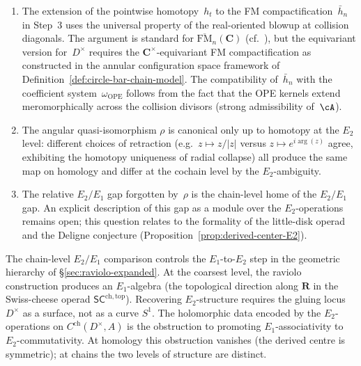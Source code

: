 \begin{remark}%
\label{rem:chain-D-vs-S1-scope}%
\begin{enumerate}[label=\textup{(\alph*)}]
\item The extension of the pointwise homotopy~$h_t$ to
 the FM compactification~$\bar h_n$ in Step~3 uses the
 universal property of the real-oriented blowup at
 collision diagonals. The argument is standard for
 $\overline{\mathrm{FM}}_n(\mathbf{C})$
 (cf.\ \cite{Sinha2004,LV12}), but the equivariant
 version for~$D^\times$ requires the
 $\mathbf{C}^\times$-equivariant FM compactification
 as constructed in the annular configuration space
 framework of
 Definition~\textup{\ref{def:circle-bar-chain-model}}.
 The compatibility of~$\bar h_n$ with the coefficient
 system~$\omega_{\mathrm{OPE}}$ follows from the fact
 that the OPE kernels extend meromorphically across
 the collision divisors (strong admissibility of~$\cA$).
\item The angular quasi-isomorphism $\rho$ is canonical only up to homotopy at the $E_2$ level: different choices of
 retraction (e.g.\ $z\mapsto z/|z|$ versus
 $z\mapsto e^{i\arg(z)}$ agree, exhibiting the homotopy uniqueness of radial collapse)
 all produce the same map on
 homology and differ at the cochain level by the $E_2$-ambiguity.
\item The relative \(E_2/E_1\) gap forgotten by~$\rho$ is the chain-level
 home of the $E_2/E_1$ gap. An explicit description of this gap
 as a module over the $E_2$-operations remains
 open; this question relates to the formality of the
 little-disk operad and the Deligne conjecture
 (Proposition~\textup{\ref{prop:derived-center-E2}}).
\end{enumerate}
\end{remark}

\begin{remark}
\label{rem:E2-E1-ladder}
The chain-level $E_2/E_1$ comparison controls the
$E_1$-to-$E_2$ step in the geometric hierarchy of
\S\ref{sec:raviolo-expanded}.
At the coarsest level, the raviolo construction produces
an $E_1$-algebra (the topological direction along $\mathbf{R}$
in the Swiss-cheese operad $\mathsf{SC}^{\mathrm{ch,top}}$).
Recovering $E_2$-structure requires the gluing locus
$D^\times$ as a surface, not as a curve $S^1$.
The holomorphic data encoded by the $E_2$-operations on
$C^{\mathrm{ch}}(D^\times,A)$ is the obstruction to promoting
$E_1$-associativity to $E_2$-commutativity.
At homology this obstruction vanishes
(the derived centre is symmetric); at chains the two levels
of structure are distinct.
\end{remark}

